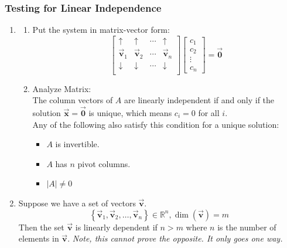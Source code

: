 \documentclass[12pt, landscape, twocolumn]{article}
\let\oldvec\vec
\renewcommand{\vec}[1]{\oldvec{\mathbf{ #1 } } }                    %
\begin{document}
        \subsubsection{Testing for Linear Independence}
        \begin{enumerate}
        \item \begin{enumerate}
            \item Put the system in matrix-vector form:
                \[
                \left[ \begin{array}{cccc}
                    \uparrow & \uparrow & \cdots & \uparrow\\
                    \vec{v}_1 & \vec{v}_2 & \cdots & \vec{v}_n\\
                    \downarrow & \downarrow & \cdots & \downarrow\\
                \end{array} \right] \left[ \begin{array}{c}
                    c_1\\
                    c_2\\
                    \vdots\\
                    c_n
                \end{array}\right] = \vec{0}
                \]
            \item Analyze Matrix:\\
                The column vectors of $A$ are linearly independent if and only if the solution $\vec{x} = \vec{0}$ is unique, which means $c_i = 0$ for all $i$.\\
                Any of the following also satisfy this condition for a unique solution:
                    \begin{itemize}
                        \item $A$ is invertible.
                        \item $A$ has $n$ pivot columns.
                        \item $|A| \neq 0$
                    \end{itemize}
            \end{enumerate}
        \item Suppose we have a set of vectors $\vec{v}$.
            \[
                \left\{ \vec{v}_1, \vec{v}_2, \ldots, \vec{v}_n \right\} \in \mathbb{R}^n, \dim(\vec{v})=m
            \]
            Then the set $\vec{v}$ is linearly dependent if $n>m$ where $n$ is the number of elements in $\vec{v}$. \textit{Note, this cannot prove the opposite. It only goes one way.}

\end{enumerate}
\end{document}
